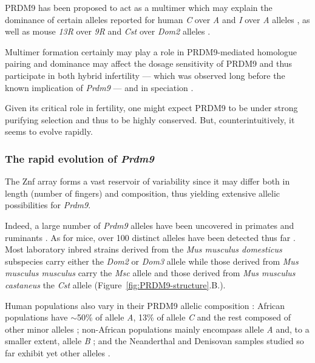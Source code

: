 PRDM9 has been proposed to act as a multimer \citep{baker2015multimer,altemose2017map,schwarz2019prdm9} which may explain the dominance of certain alleles reported for human \textit{C} over \textit{A} \citep{pratto2014recombination} and \textit{I} over \textit{A} alleles \citep{baudat2010prdm9}, as well as mouse \textit{13R} over \textit{9R} \citep{brick2012genetic} and \textit{Cst} over \textit{Dom2} alleles \citep{smagulova2011genomewide, baker2015prdm9, baker2015multimer}.

Multimer formation certainly may play a role in PRDM9-mediated homologue pairing \citep{davies2016reengineering} and dominance may affect the dosage sensitivity of PRDM9 \citep{flachs2012interallelic, segurel2011case} and thus participate in both hybrid infertility — which was observed long before the known implication of \textit{Prdm9} \citep{forejt1974genetic} — and in speciation \citep{mihola2009mouse}.

Given its critical role in fertility, one might expect PRDM9 to be under strong purifying selection and thus to be highly conserved. 
But, counterintuitively, it seems to evolve rapidly.


\subsubsection{The rapid evolution of \textit{Prdm9}}

The Znf array forms a vast reservoir of variability since it may differ both in length (number of fingers) and composition, thus yielding extensive allelic possibilities for \textit{Prdm9}.

Indeed, a large number of \textit{Prdm9} alleles have been uncovered in primates \citep{groeneveld2012high,heerschop2016pioneering} and ruminants \citep{ahlawat2016zinc}.
As for mice, over 100 distinct alleles have been detected thus far \citep{buard2014diversity, kono2014prdm9}.
Most laboratory inbred strains derived from the \textit{Mus musculus domesticus} subspecies carry either the \textit{Dom2} or \textit{Dom3} allele while those derived from \textit{Mus musculus musculus} carry the \textit{Msc} allele and those derived from \textit{Mus musculus castaneus} the \textit{Cst} allele (Figure~\ref{fig:PRDM9-structure}.B.).

Human populations also vary in their PRDM9 allelic composition \citep{berg2010prdm9, berg2011variants, fledel-alon2011variation}: African populations have $\sim$50\% of allele \textit{A}, 13\% of allele \textit{C} and the rest composed of other minor alleles \citep{berg2011variants}; non-African populations mainly encompass allele \textit{A} and, to a smaller extent, allele \textit{B} \citep{baudat2010prdm9,berg2010prdm9,hinch2011landscape}; and the Neanderthal and Denisovan samples studied so far exhibit yet other alleles \citep{schwartz2014primate,lesecque2014red}.\\


